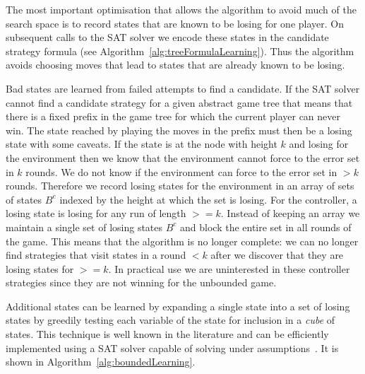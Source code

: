 The most important optimisation that allows the algorithm to avoid much of the search space is to record states that are known to be losing for one player. On subsequent calls to the SAT solver we encode these states in the candidate strategy formula (see Algorithm~\ref{alg:treeFormulaLearning}). Thus the algorithm avoids choosing moves that lead to states that are already known to be losing.

Bad states are learned from failed attempts to find a candidate. If the SAT solver cannot find a candidate strategy for a given abstract game tree that means that there is a fixed prefix in the game tree for which the current player can never win. The state reached by playing the moves in the prefix must then be a losing state with some caveats. If the state is at the node with height $k$ and losing for the environment then we know that the environment cannot force to the error set in $k$ rounds. We do not know if the environment can force to the error set in $> k$ rounds. Therefore we record losing states for the environment in an array of sets of states $B^e$ indexed by the height at which the set is losing. For the controller, a losing state is losing for any run of length $>= k$. Instead of keeping an array we maintain a single set of losing states $B^c$ and block the entire set in all rounds of the game. This means that the algorithm is no longer complete: we can no longer find strategies that visit states in a round $<k$ after we discover that they are losing states for $>=k$. In practical use we are uninterested in these controller strategies since they are not winning for the unbounded game.

Additional states can be learned by expanding a single state into a set of losing states by greedily testing each variable of the state for inclusion in a \emph{cube} of states. This technique is well known in the literature and can be efficiently implemented using a SAT solver capable of solving under assumptions~\cite{Een03}. It is shown in Algorithm~\ref{alg:boundedLearning}.

